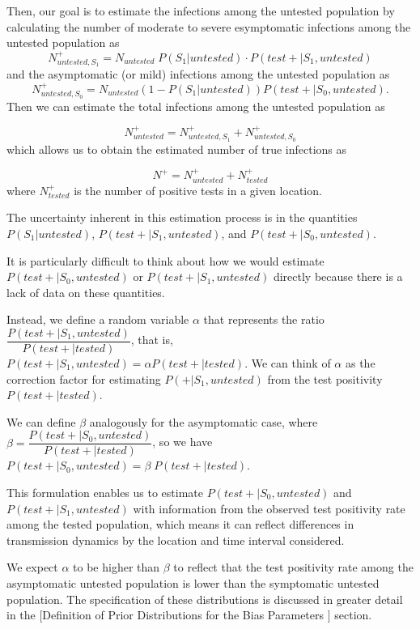 \documentclass[12pt,twoside]{smiththesis}
\begin{document}
Then, our goal is to estimate the infections among the untested population by calculating the number of moderate to severe esymptomatic infections among the untested population as
\[N^+_{untested,S_1} = N_{untested} \; P(S_1|untested) \cdot P(test + | S_1,untested)\]
and the asymptomatic (or mild) infections among the untested population as
\[N^+_{untested,S_0} = N_{untested}(1-P(S_1|untested))P(test + | S_0,untested).\]
Then we can estimate the total infections among the untested population as

\[N^+_{untested} = N^+_{untested,S_1} + N^+_{untested,S_0}\]
which allows us to obtain the estimated number of true infections as

\[N^+ = N^+_{untested} +N^+_{tested}\]
where \(N^+_{tested}\) is the number of positive tests in a given location.

The uncertainty inherent in this estimation process is in the quantities \(P(S_1|untested)\), \(P(test + | S_1,untested)\), and \(P(test + | S_0,untested)\).

It is particularly difficult to think about how we would estimate \(P(test + | S_0,untested)\) or \(P(test + | S_1,untested)\) directly because there is a lack of data on these quantities.

Instead, we define a random variable \(\alpha\) that represents the ratio \(\dfrac{P(test + |S_1, untested)}{P(test + | tested)}\), that is, \(P(test + |S_1, untested) = \alpha P(test+|tested)\). We can think of \(\alpha\) as the correction factor for estimating \(P(+|S_1,untested)\) from the test positivity \(P(test + |tested)\).

We can define \(\beta\) analogously for the asymptomatic case, where \(\beta = \dfrac{P(test + |S_0, untested)}{P(test + | tested)}\), so we have \(P(test + |S_0, untested) = \beta \; P(test + | tested)\).

This formulation enables us to estimate \(P(test + |S_0, untested)\) and \(P(test + |S_1, untested)\) with information from the observed test positivity rate among the tested population, which means it can reflect differences in transmission dynamics by the location and time interval considered.

We expect \(\alpha\) to be higher than \(\beta\) to reflect that the test positivity rate among the asymptomatic untested population is lower than the symptomatic untested population. The specification of these distributions is discussed in greater detail in the {[}Definition of Prior Distributions for the Bias Parameters {]} section.
\end{document}
